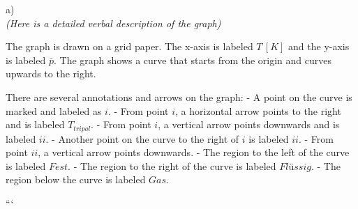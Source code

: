 a) \\
\textit{(Here is a detailed verbal description of the graph)}

The graph is drawn on a grid paper. The x-axis is labeled $T \, [K]$ and the y-axis is labeled $\bar{p}$. The graph shows a curve that starts from the origin and curves upwards to the right. 

There are several annotations and arrows on the graph:
- A point on the curve is marked and labeled as $i$.
- From point $i$, a horizontal arrow points to the right and is labeled $T_{tripol}$.
- From point $i$, a vertical arrow points downwards and is labeled $ii$.
- Another point on the curve to the right of $i$ is labeled $ii$.
- From point $ii$, a vertical arrow points downwards.
- The region to the left of the curve is labeled $Fest$.
- The region to the right of the curve is labeled $Flüssig$.
- The region below the curve is labeled $Gas$.

```